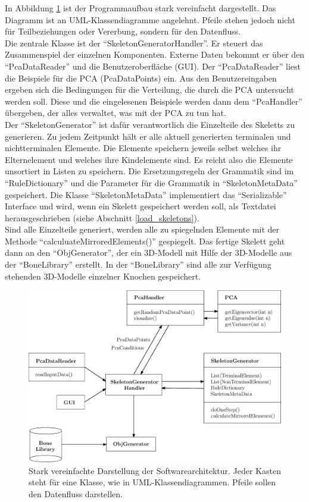 In Abbildung \ref{classDiagram} ist der Programmaufbau stark vereinfacht dargestellt. Das Diagramm ist an UML-Klassendiagramme angelehnt. Pfeile stehen jedoch nicht für Teilbeziehungen oder Vererbung, sondern für den Datenfluss.\\
Die zentrale Klasse ist der "`SkeletonGeneratorHandler"'. Er steuert das Zusammenspiel der einzelnen Komponenten.
Externe Daten bekommt er über den "`PcaDataReader"' und die Benutzeroberfläche (GUI). Der "`PcaDataReader"' liest die Beispiele für die PCA (PcaDataPoints) ein. Aus den Benutzereingaben ergeben sich die Bedingungen für die Verteilung, die durch die PCA untersucht werden soll. Diese und die eingelesenen Beispiele werden dann dem "`PcaHandler"' übergeben, der alles verwaltet, was mit der PCA zu tun hat.\\
Der "`SkeletonGenerator"' ist dafür verantwortlich die Einzelteile des Skeletts zu generieren. Zu jedem Zeitpunkt hält er alle aktuell generierten terminalen und nichtterminalen Elemente. Die Elemente speichern jeweils selbst welches ihr Elternelement und welches ihre Kindelemente sind. Es reicht also die Elemente unsortiert in Listen zu speichern. Die Ersetzungsregeln der Grammatik sind im "`RuleDictionary"' und die Parameter für die Grammatik in "`SkeletonMetaData"' gespeichert. Die Klasse "`SkeletonMetaData"' implementiert das "`Serializable"' Interface \cite{JavaSerialization} und wird, wenn ein Skelett gespeichert werden soll, als Textdatei herausgeschrieben (siehe Abschnitt \ref{load_skeletons}).\\
Sind alle Einzelteile generiert, werden alle zu spiegelnden Elemente mit der Methode \mbox{"`calculuateMirroredElements()"'} gespiegelt. Das fertige Skelett geht dann an den "`ObjGenerator"', der ein 3D-Modell mit Hilfe der 3D-Modelle aus der "`BoneLibrary"' erstellt. In der "`BoneLibrary"' sind alle zur Verfügung stehenden 3D-Modelle einzelner Knochen gespeichert.

\begin{figure}[ht]
 \includegraphics[width=\textwidth]{graphics/classDiagram}
 \caption{Stark vereinfachte Darstellung der Softwarearchitektur. Jeder Kasten steht für eine Klasse, wie in UML-Klassendiagrammen. Pfeile sollen den Datenfluss darstellen.}
 \label{classDiagram}
\end{figure}


